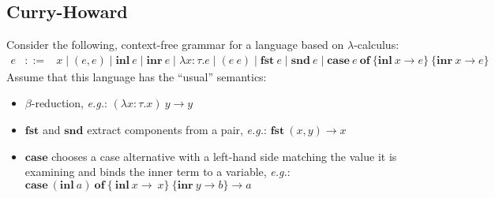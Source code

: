 \documentclass[10pt,a4paper]{exam} %
\begin{document}
\begin{questions}

\section*{Curry-Howard}
\question Consider the following, context-free grammar for a language based on $\lambda$-calculus:
\begin{displaymath}
\begin{array}{lcl}
e & ::= & x \mid (e,e) \mid \mathbf{inl}~e \mid \mathbf{inr}~e \mid \lambda x : \tau.e \mid (e~e) \mid \mathbf{fst}~e \mid \mathbf{snd}~e \mid \mathbf{case}~e~\mathbf{of}~\{\mathbf{inl}~x \to e\}~\{\mathbf{inr}~x \to e\}
\end{array}
\end{displaymath}
Assume that this language has the ``usual'' semantics:
\begin{itemize}
\item $\beta$-reduction, \emph{e.g.}: $(\lambda x : \tau.x)~y \longrightarrow y$
\item $\mathbf{fst}$ and $\mathbf{snd}$ extract components from a pair, \emph{e.g.}: $\mathbf{fst}~(x,y) \longrightarrow x$
\item $\mathbf{case}$ chooses a case alternative with a left-hand side matching the value it is examining and binds the inner term to a variable, \emph{e.g.}: $\mathbf{case}~(\mathbf{inl}~a)~\mathbf{of}~\{~\mathbf{inl}~x \to~x\}~\{\mathbf{inr}~y \to b\} \longrightarrow a$
\end{itemize}
\end{questions}
\end{document}
